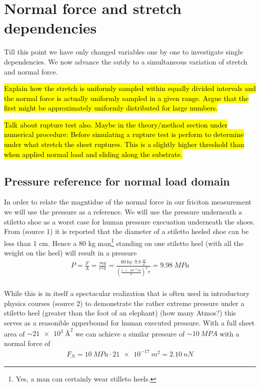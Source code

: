 \section{Normal force and stretch dependencies}\label{sec:load_and_stretch}
Till this point we have only changed variables one by one to investigate single dependencies. We now advance the sutdy to a simultaneous variation of stretch and normal force.

\hl{Explain how the stretch is uniformly sampled within equally divided intervals and the normal force is actually uniformly sampled in a given range. Argue that the first might be approximately uniformly distributed for large numbers.}

\hl{Talk about rupture test also. Maybe in the theory/method section under numerical procedure: Before simulating a rupture test is perform to determine under what stretch the sheet ruptures. This is a slightly higher threshold than when applied normal load and sliding along the substrate.}



\subsection{Pressure reference for normal load domain}

In order to relate the magntidue of the normal force in our friciton measurement
we will use the pressure as a reference. We will use the pressure underneath a
stiletto shoe as a worst case for human pressure execuation underneath the
shoes. From (source 1) it is reported that the diameter of a stiletto heeled
shoe can be less than 1 cm. Hence a 80 kg man\footnote{Yes, a man can certainly
wear stilleto heels.} standing on one stiletto heel (with all the weight on the
heel) will result in a pressure
\begin{align*}
  P = \frac{F}{A} = \frac{mg}{r^2\pi} = \frac{\SI{80}{kg} \cdot \SI{9.8}{\frac{m}{s^2}}}{(\frac{\SI{1e-2}{m}}{2})^2 \pi} = \SI{9.98}{MPa} \\
\end{align*} 

While this is in itself a spectacular realization that is often used in
introductory physics courses (source 2) to demonstrate the rather extreme
pressure under a stiletto heel (greater than the foot of an elephant) (how many
Atmos?) this serves as a reasonible upperbound for human executed pressure. With
a full sheet area of $\sim\SI{21e3}{{\text{Å}}^2}$ we can achieve a similar pressure of
$\sim \SI{10}{MPA}$ with a normal force of
\begin{align*}
  F_N = \SI{10}{MPa} \cdot \SI{21e-17}{m^2} = \SI{2.10}{nN}  
\end{align*}

